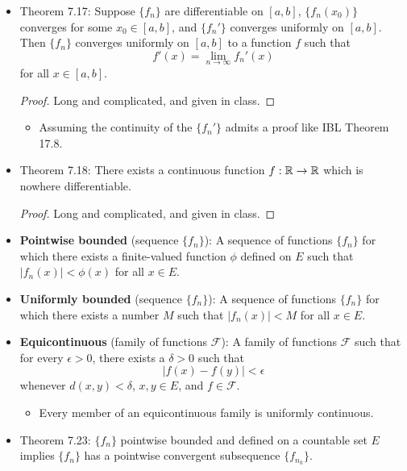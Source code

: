 \documentclass[../../notes.tex]{subfiles}
\begin{document}
\begin{itemize}
\begin{proof}
        See IBL Theorem 17.7; \textcite{bib:Rudin}'s is much slicker though.
    \end{proof}
    \item Theorem 7.17: Suppose $\{f_n\}$ are differentiable on $[a,b]$, $\{f_n(x_0)\}$ converges for some $x_0\in[a,b]$, and $\{f_n'\}$ converges uniformly on $[a,b]$. Then $\{f_n\}$ converges uniformly on $[a,b]$ to a function $f$ such that
    \begin{equation*}
        f'(x) = \lim_{n\to\infty}f_n'(x)
    \end{equation*}
    for all $x\in[a,b]$.
    \begin{proof}
        Long and complicated, and given in class.
    \end{proof}
    \begin{itemize}
        \item Assuming the continuity of the $\{f_n'\}$ admits a proof like IBL Theorem 17.8.
    \end{itemize}
    \item Theorem 7.18: There exists a continuous function $f:\mathbb{R}\to\mathbb{R}$ which is nowhere differentiable.
    \begin{proof}
        Long and complicated, and given in class.
    \end{proof}
    \item \textbf{Pointwise bounded} (sequence $\{f_n\}$): A sequence of functions $\{f_n\}$ for which there exists a finite-valued function $\phi$ defined on $E$ such that $|f_n(x)|<\phi(x)$ for all $x\in E$.
    \item \textbf{Uniformly bounded} (sequence $\{f_n\}$): A sequence of functions $\{f_n\}$ for which there exists a number $M$ such that $|f_n(x)|<M$ for all $x\in E$.
    \item \textbf{Equicontinuous} (family of functions $\mathscr{F}$): A family of functions $\mathscr{F}$ such that for every $\epsilon>0$, there exists a $\delta>0$ such that
    \begin{equation*}
        |f(x)-f(y)| < \epsilon
    \end{equation*}
    whenever $d(x,y)<\delta$, $x,y\in E$, and $f\in\mathscr{F}$.
    \begin{itemize}
        \item Every member of an equicontinuous family is uniformly continuous.
    \end{itemize}
    \item Theorem 7.23: $\{f_n\}$ pointwise bounded and defined on a countable set $E$ implies $\{f_n\}$ has a pointwise convergent subsequence $\{f_{n_k}\}$.

\end{itemize}
\end{document}
